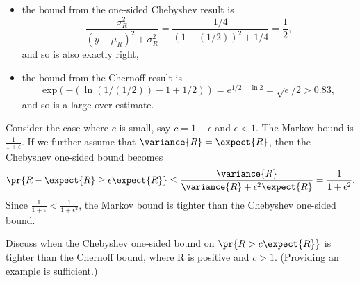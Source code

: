 \begin{problem}
\begin{problemparts}
{\begin{itemize}
\item the bound from the one-sided Chebyshev result is
\[
\frac{\sigma_R^2}{(y - \mu_R)^2 + \sigma_R^2} = \frac{1/4}{(1-(1/2))^2
+ 1/4} = \frac{1}{2},
\]
and so is also exactly right,

\item the bound from the Chernoff result is
\[
\text{exp}(- (\ln (1/(1/2)) - 1 + 1/2)) = e^{1/2 - \ln 2} = \sqrt{e}/2 > 0.83,
\]
and so is a large over-estimate.

\end{itemize}

Consider the case where $c$ is small, say $c=1+\epsilon$ and
$\epsilon <1$. The Markov bound is $\frac{1}{1+\epsilon}$.  If we further
assume that $\variance{R}=\expect{R}$, then the Chebyshev one-sided
bound becomes
\[
\pr{R-\expect{R} \geq \epsilon \expect{R}} \leq
\frac{\variance{R}}{\variance{R}+\epsilon^2 \expect{R}} =
\frac{1}{1+\epsilon^2}.
\]
Since $\frac{1}{1+\epsilon}< \frac{1}{1+\epsilon^2}$, the Markov bound is
tighter than the Chebyshev one-sided bound.}

\problempart Discuss when the Chebyshev one-sided bound on $\pr{R >
c\expect{R}}$ is tighter than the Chernoff bound, where R is positive and
$c>1$. (Providing an example is sufficient.)


\end{problemparts}
\end{problem}



